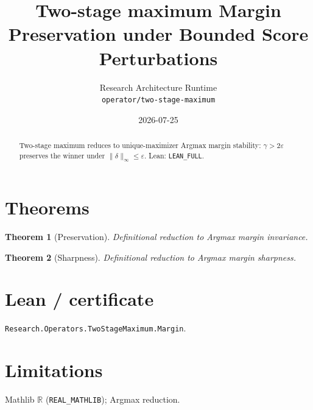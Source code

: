 \documentclass[11pt]{article}
\title{Two-stage maximum Margin Preservation under Bounded Score Perturbations}
\author{Research Architecture Runtime \\ \texttt{operator/two-stage-maximum}}
\date{2026-07-25}
\newtheorem{theorem}{Theorem}
\begin{document}
\maketitle
\begin{abstract}
Two-stage maximum reduces to unique-maximizer Argmax margin stability: $\gamma>2\varepsilon$
preserves the winner under $\|\delta\|_\infty\le\varepsilon$. Lean: \texttt{LEAN\_FULL}.
\end{abstract}
\section{Theorems}
\begin{theorem}[Preservation]
Definitional reduction to Argmax margin invariance.
\end{theorem}
\begin{theorem}[Sharpness]
Definitional reduction to Argmax margin sharpness.
\end{theorem}
\section{Lean / certificate}
\texttt{Research.Operators.TwoStageMaximum.Margin}.
\section{Limitations}
Mathlib $\mathbb{R}$ (\texttt{REAL\_MATHLIB}); Argmax reduction.
\end{document}
